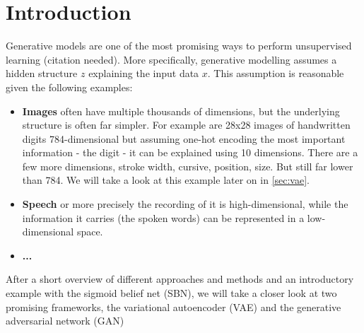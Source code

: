 \section{Introduction}
\label{sec:introduction}
Generative models are one of the most promising ways to perform unsupervised learning (citation needed).
More specifically, generative modelling assumes a hidden structure $z$ explaining the input data $x$.
This assumption is reasonable given the following examples:\\

\begin{itemize}
  \item \textbf{Images} often have multiple thousands of dimensions, but the underlying structure is often far simpler. For example are 28x28 images of handwritten digits 784-dimensional but assuming one-hot encoding the most important information - the digit - it can be explained using 10 dimensions. There are a few more dimensions, stroke width, cursive, position, size. But still far lower than 784. We will take a look at this example later on in \ref{sec:vae}.
  \item \textbf{Speech} or more precisely the recording of it is high-dimensional, while the information it carries (the spoken words) can be represented in a low-dimensional space.
  \item \textbf{...}
\end{itemize}

After a short overview of different approaches and methods and an introductory example with the sigmoid belief net (SBN), we will take a closer look at two promising frameworks, the variational autoencoder (VAE) and the generative adversarial network (GAN)






